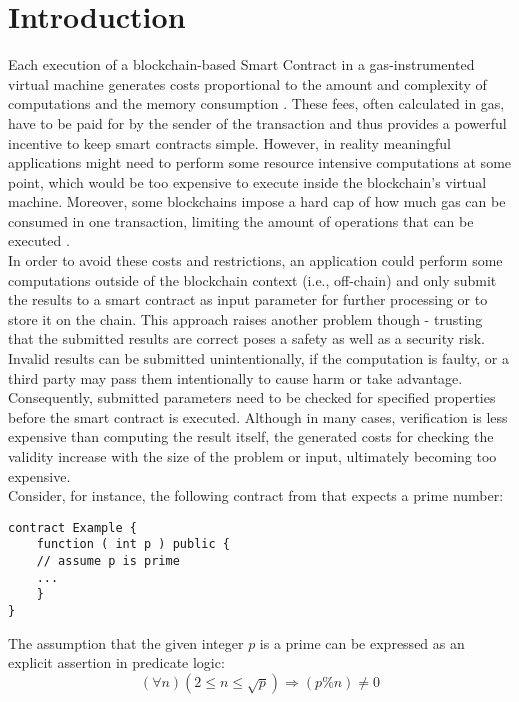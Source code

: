 \chapter{Introduction}\label{chap:introduction}
Each execution of a blockchain-based Smart Contract in a gas-instrumented virtual machine generates costs proportional to the amount and complexity of computations and the  memory consumption \cite{goodman_tezos_2014}\cite{wood_ethereum_2021}. These fees, often calculated in gas, have to be paid for by the sender of the transaction and thus provides a powerful incentive to keep  smart contracts simple. However, in reality meaningful applications might need to perform some resource intensive computations at some point, which would be too expensive to execute inside the blockchain's virtual machine. Moreover, some blockchains impose a hard cap of how much gas can be consumed in one transaction, limiting the amount of operations that can be executed \cite{goodman_tezos_2014}.\\
In order to avoid these costs and restrictions, an application could perform some computations outside of the blockchain context (i.e., off-chain) and only submit the results to a smart contract as input parameter for further processing or to store it on the chain. This approach raises another problem though - trusting that the submitted results are correct poses a safety as well as a security risk. Invalid results can be submitted unintentionally, if the computation is faulty, or a third party may pass them intentionally to cause harm or take advantage. Consequently, submitted parameters need to be checked for specified properties before the smart contract is executed. Although in many cases, verification is less expensive than computing the result itself, the generated costs for checking the validity increase with the size of the problem or input, ultimately becoming too expensive. \\
Consider, for instance, the following contract from \cite{thiemann_2020} that expects a prime number: 
\begin{lstlisting}[caption=Smart contract expecting a prime number, numbers=none, language=Solidity, label=lst:prime]
contract Example {
	function ( int p ) public {
	// assume p is prime
	...
	}
}
\end{lstlisting}

The assumption that the given integer $p$ is a prime can be expressed as an explicit assertion in predicate logic: 
\begin{equation}\label{eq:prime}
    (\forall n) (2 \le n \le \sqrt{p}) \Rightarrow (p \% n) \neq 0
\end{equation}

